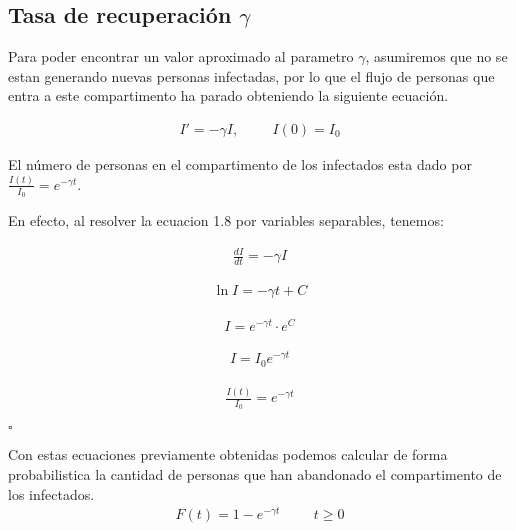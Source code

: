 \subsection{Tasa de recuperación \textbf{$\gamma$}}

Para poder encontrar un valor aproximado al parametro $\gamma$, asumiremos que no se estan generando nuevas personas infectadas, por lo que el flujo de personas que entra a este compartimento ha parado obteniendo la siguiente ecuación.

\begin{align}
I' = -\gamma I, \hspace{1cm} I(0) = I_{0}
\end{align}

\begin{Af}
El número de personas en el compartimento de los infectados esta dado por $\frac{I(t)}{I_{0}} = e^{-\gamma t}$.
\end{Af}

\begin{Dem}
En efecto, al resolver la ecuacion 1.8 por variables separables, tenemos: 

\begin{align*}
\frac{dI}{dt} = - \gamma I
\end{align*}

\begin{align*}
\ln{I} = - \gamma t + C
\end{align*}

\begin{align*}
I = e^{- \gamma t} \cdot e^{C}
\end{align*}

\begin{align*}
I = I_{0} e^{- \gamma t}
\end{align*}

\begin{align*}
\frac{I(t)}{I_{0}} = e^{-\gamma t}
\end{align*}

\hfill	$\square$

\end{Dem}

Con estas ecuaciones previamente obtenidas podemos calcular de forma probabilistica la cantidad de personas que han abandonado el compartimento de los infectados.
\begin{align}
F(t) = 1 -  e^{-\gamma t} \hspace{1cm} t \geq  0
\end{align}

